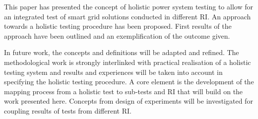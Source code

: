 This paper has presented the concept of holistic power system testing to allow for an integrated test of smart grid solutions conducted in different RI.
An approach towards a holistic testing procedure has been proposed.
First results of the approach have been outlined and an exemplification of the outcome given.

In future work, the concepts and definitions will be adapted and refined. The methodological work is strongly interlinked with practical realisation of a holistic testing system and results and experiences will be taken into account in specifying the holistic testing procedure.
A core element is the development of the mapping process from a holistic test to sub-tests and RI that will build on the work presented here.
Concepts from design of experiments will be investigated for coupling results of tests from different RI.